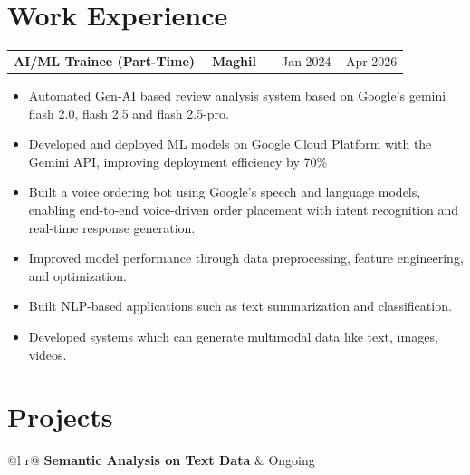 \documentclass[a4paper,12pt]{article}
\makeatletter
\newenvironment{joblong}[2]
    {
    \begin{tabularx}{\linewidth}{@{}l X r@{}}
    \textbf{#1} & \hfill &  #2 \\[3.75pt]
    \end{tabularx}
    \begin{minipage}[t]{\linewidth}
    \begin{itemize}[nosep,after=\strut, leftmargin=1em, itemsep=3pt,label=--]
    }
    {
    \end{itemize}
    \end{minipage}    
    }
\makeatother
\begin{document}
\section{Work Experience}

\begin{joblong}{AI/ML Trainee (Part-Time) -- Maghil}{Jan 2024 -- Apr 2026}

\item Automated Gen-AI based review analysis system based on Google's gemini flash 2.0, flash 2.5 and flash 2.5-pro.
\item Developed and deployed ML models on Google Cloud Platform with the Gemini API, improving deployment efficiency by 70\%
\item Built a voice ordering bot using Google's speech and language models, enabling end-to-end voice-driven order placement with intent recognition and real-time response generation.
\item Improved model performance through data preprocessing, feature engineering, and optimization.
\item Built NLP-based applications such as text summarization and classification.
\item Developed systems which can generate multimodal data like text, images, videos.
\end{joblong}

\section{Projects}

\begin{tabularx}{\linewidth}{ @{}l r@{} }
\textbf{Semantic Analysis on Text Data} & Ongoing \\[3.75pt]
 \\
\end{tabularx}
\end{document}
